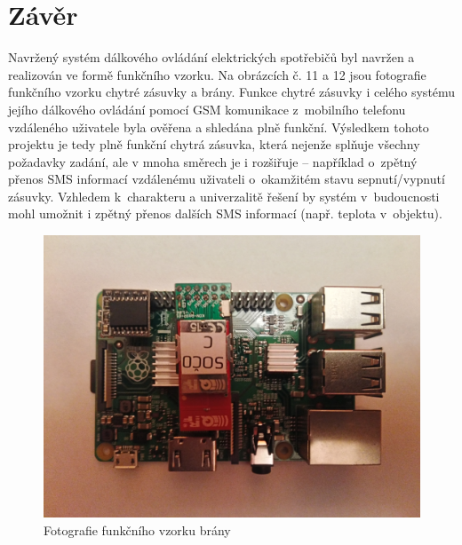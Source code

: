 \documentclass[12pt,a4paper,oneside]{article}
\begin{document}
\newpage

\section*{Závěr}


Navržený systém dálkového ovládání elektrických spotřebičů byl navržen a realizován ve formě funkčního vzorku. Na obrázcích č. 11 a 12 jsou fotografie funkčního vzorku chytré zásuvky a brány. Funkce chytré zásuvky i celého systému jejího dálkového ovládání pomocí GSM komunikace z~mobilního telefonu vzdáleného uživatele byla ověřena a shledána plně funkční. Výsledkem tohoto projektu je tedy plně funkční chytrá zásuvka, která nejenže splňuje všechny požadavky zadání, ale v mnoha směrech je i rozšiřuje – například o~zpětný přenos SMS informací vzdálenému uživateli o~okamžitém stavu sepnutí/vypnutí zásuvky. Vzhledem k~charakteru a univerzalitě řešení by systém v~budoucnosti mohl umožnit i zpětný přenos dalších SMS informací (např. teplota v~objektu).

\begin{figure}[H]
\centering
\label{fig:foto/brana}
\includegraphics[width = 128mm]{img/foto-brana.jpg}
\caption{Fotografie funkčního vzorku brány}
\end{figure}

\newpage

\printindex[zkr]


\newpage
\end{document}
